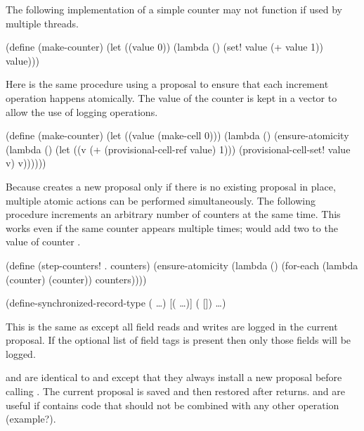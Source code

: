 \documentclass[twoside]{report}
\begin{document}
The following implementation of a simple counter may not function
 if used by multiple threads.
\begin{example}
(define (make-counter)
  (let ((value 0))
    (lambda ()
      (set! value (+ value 1))
      value)))
\end{example}

Here is the same procedure using a proposal to ensure that each
 increment operation happens atomically.
The value of the counter is kept in a vector to allow the use of
 logging operations.
\begin{example}
(define (make-counter)
  (let ((value (make-cell 0)))
    (lambda ()
      (ensure-atomicity
        (lambda ()
          (let ((v (+ (provisional-cell-ref value)
                      1)))
            (provisional-cell-set! value v)
            v))))))
\end{example}

Because  creates a new proposal only if there is
 no existing proposal in place, multiple atomic actions can be performed
 simultaneously.
The following procedure increments an arbitrary number of counters at the same
 time.
This works even if the same counter appears multiple times;
  would add two to the value of counter .
\begin{example}
(define (step-counters! . counters)
  (ensure-atomicity
    (lambda ()
      (for-each (lambda (counter)
                  (counter))
                counters))))
\end{example}

\begin{example}
(define-synchronized-record-type  
  (  \ldots)
  [(\cvar {} \ldots)]
  (  [])
  \ldots)
\end{example}
This is the same as  except all field reads and
 writes are logged in the current proposal.
If the optional list of field tags is present then only those fields will
 be logged.

\begin{protos}
\end{protos}
\noindent
{} and  are identical
 to  and  except that they
 always install a new proposal before calling .
The current proposal is saved and then restored after  returns.
 and  are useful if  contains
 code that should not be combined with any other operation (example?).
\end{document}
